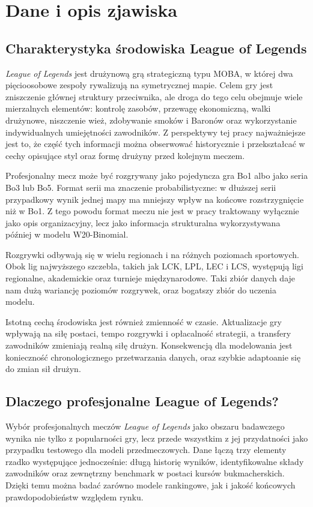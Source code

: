 \chapter{Dane i opis zjawiska}

\section{Charakterystyka środowiska League of Legends}

\textit{League of Legends} jest drużynową grą strategiczną typu MOBA, w której dwa pięcioosobowe zespoły rywalizują na symetrycznej mapie. Celem gry jest zniszczenie głównej struktury przeciwnika, ale droga do tego celu obejmuje wiele mierzalnych elementów: kontrolę zasobów, przewagę ekonomiczną, walki drużynowe, niszczenie wież, zdobywanie smoków i Baronów oraz wykorzystanie indywidualnych umiejętności zawodników. Z perspektywy tej pracy najważniejsze jest to, że część tych informacji można obserwować historycznie i przekształcać w cechy opisujące styl oraz formę drużyny przed kolejnym meczem.

Profesjonalny mecz może być rozgrywany jako pojedyncza gra Bo1 albo jako seria Bo3 lub Bo5. Format serii ma znaczenie probabilistyczne: w dłuższej serii przypadkowy wynik jednej mapy ma mniejszy wpływ na końcowe rozstrzygnięcie niż w Bo1. Z tego powodu format meczu nie jest w pracy traktowany wyłącznie jako opis organizacyjny, lecz jako informacja strukturalna wykorzystywana później w modelu W20-Binomial.

Rozgrywki odbywają się w wielu regionach i na różnych poziomach sportowych. Obok lig najwyższego szczebla, takich jak LCK, LPL, LEC i LCS, występują ligi regionalne, akademickie oraz turnieje międzynarodowe. 
Taki zbiór danych daje nam dużą wariancję poziomów rozgrywek, oraz bogatszy zbiór do uczenia modelu.

Istotną cechą środowiska jest również zmienność w czasie.
Aktualizacje gry wpływają na siłę postaci, tempo rozgrywki i opłacalność strategii, a transfery zawodników zmieniają realną siłę drużyn. 
Konsekwencją dla modelowania jest konieczność chronologicznego przetwarzania danych, oraz szybkie adaptoanie się do zmian sił drużyn.

\section{Dlaczego profesjonalne League of Legends?}

Wybór profesjonalnych meczów \textit{League of Legends} jako obszaru badawczego wynika nie tylko z popularności gry, lecz przede wszystkim z jej przydatności jako przypadku testowego dla modeli przedmeczowych. Dane łączą trzy elementy rzadko występujące jednocześnie: długą historię wyników, identyfikowalne składy zawodników oraz zewnętrzny benchmark w postaci kursów bukmacherskich. Dzięki temu można badać zarówno modele rankingowe, jak i jakość końcowych prawdopodobieństw względem rynku.

